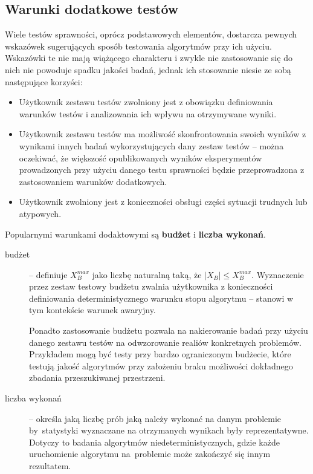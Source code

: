 \documentclass[12pt,a4paper]{report}
\begin{document}
{{{{{{\subsection{Warunki dodatkowe testów}
\par
{
Wiele testów sprawności, oprócz podstawowych elementów, dostarcza pewnych wskazówek sugerujących sposób testowania algorytmów przy ich użyciu. Wskazówki te nie mają wiążącego charakteru i zwykle nie zastosowanie się do nich nie powoduje spadku jakości badań, jednak ich stosowanie niesie ze sobą następujące korzyści:
\begin{itemize}
\item Użytkownik zestawu testów zwolniony jest z obowiązku definiowania warunków testów i analizowania ich wpływu na otrzymywane wyniki.
\item Użytkownik zestawu testów ma możliwość skonfrontowania swoich wyników z wynikami innych badań wykorzystujących dany zestaw testów -- można oczekiwać, że większość opublikowanych wyników eksperymentów prowadzonych przy użyciu danego testu sprawności będzie przeprowadzona z zastosowaniem warunków dodatkowych.
\item Użytkownik zwolniony jest z konieczności obsługi części sytuacji trudnych lub atypowych.
\end{itemize}
}
\par{
Popularnymi warunkami dodaktowymi są \textbf{budżet} i \textbf{liczba wykonań}.
\begin{description}
\item[budżet] -- definiuje $X_{B}^{max}$ jako liczbę naturalną taką, że $|X_B| \le X_{B}^{max}$. Wyznaczenie przez zestaw testowy budżetu zwalnia użytkownika z konieczności definiowania deterministycznego warunku stopu algorytmu -- stanowi w tym kontekście warunek awaryjny.

Ponadto zastosowanie budżetu pozwala na nakierowanie badań przy użyciu danego zestawu testów na odwzorowanie realiów konkretnych problemów. Przykładem mogą być testy przy bardzo ograniczonym budżecie, które testują jakość algorytmów przy założeniu braku możliwości dokładnego zbadania przeszukiwanej przestrzeni.
\item[liczba wykonań] -- określa jaką liczbę prób jaką należy wykonać na danym problemie by~statystyki wyznaczane na otrzymanych wynikach były reprezentatywne. Dotyczy to badania algorytmów niedeterministycznych, gdzie każde uruchomienie algorytmu na~problemie może zakończyć się innym rezultatem.
\end{description}
}

}}}}}}
\end{document}

